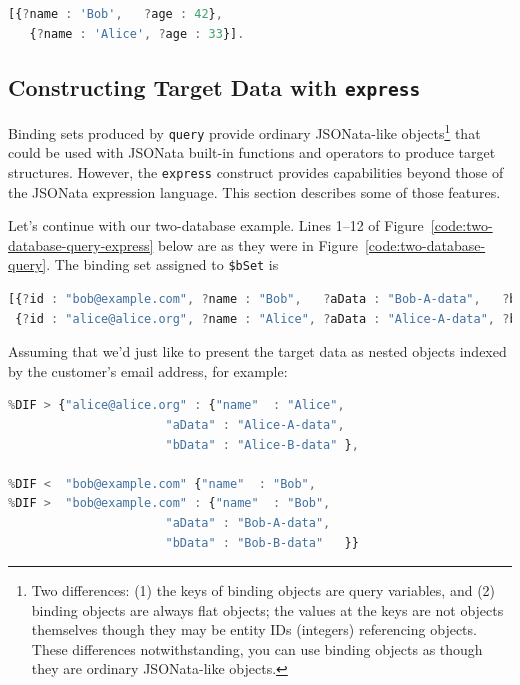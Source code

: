 \documentclass[10pt,letterpaper]{article} %
\newcommand{\stt}[1]{\texttt{#1}} %
\providecommand{\DIFmodbegin}{} %
\providecommand{\DIFmodend}{} %
\begin{document}
\begin{lstlisting}[language=JavaScript,numbers=none,basicstyle=\ttfamily\scriptsize]
  [{?name : 'Bob',   ?age : 42},
   {?name : 'Alice', ?age : 33}].
\end{lstlisting} \vspace{-2em}

\subsection{Constructing  Target Data with \stt{express}}

Binding sets produced by \stt{query} provide ordinary JSONata-like objects\footnote{Two differences: (1) the keys of binding objects are query variables, and (2) binding objects are always flat objects; the values at the keys are not objects themselves though they may be entity IDs (integers) referencing objects. These differences notwithstanding, you can use binding objects as though they are ordinary JSONata-like objects.} that could be used with JSONata built-in functions and operators to produce target structures.
However, the \stt{express} construct provides capabilities beyond those of the JSONata expression language.
This section describes some of those features.

Let's continue with our two-database example.
Lines 1--12 of Figure~\ref{code:two-database-query-express} below are as they were in Figure~\ref{code:two-database-query}.
The binding set assigned to \stt{\$bSet} is
\begin{lstlisting}[language=JavaScript,numbers=none,basicstyle=\ttfamily\scriptsize]
[{?id : "bob@example.com", ?name : "Bob",   ?aData : "Bob-A-data",   ?bData : "Bob-B-data"  },
 {?id : "alice@alice.org", ?name : "Alice", ?aData : "Alice-A-data", ?bData : "Alice-B-data"}].
\end{lstlisting} \vspace{-2em}

Assuming that we'd just like to present the target data as nested objects indexed by the customer's email address, for example:

\DIFmodbegin
\begin{lstlisting}[language=JavaScript,numbers=none,basicstyle=\ttfamily\scriptsize,alsolanguage=DIFcode]
%DIF < {"alice@alice.org" {"name"  : "Alice",
%DIF > {"alice@alice.org" : {"name"  : "Alice",
                      "aData" : "Alice-A-data",
                      "bData" : "Alice-B-data" },

%DIF <  "bob@example.com" {"name"  : "Bob",
%DIF >  "bob@example.com" : {"name"  : "Bob",
                      "aData" : "Bob-A-data",
                      "bData" : "Bob-B-data"   }}
\end{lstlisting}
\DIFmodend \vspace{-2em}
\end{document}
